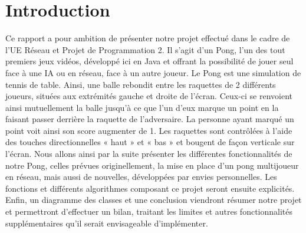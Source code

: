 \chapter{Introduction}

Ce rapport a pour ambition de présenter notre projet effectué dans le cadre de l'UE Réseau et Projet
de Programmation 2. Il s'agit d'un Pong, l'un des tout premiers jeux vidéos, développé ici en Java
et offrant la possibilité de jouer seul face à une IA ou en réseau, face à un autre joueur. Le Pong est
une simulation de tennis de table. Ainsi, une balle rebondit entre les raquettes de 2 différents
joueurs, situées aux extrémités gauche et droite de l'écran. Ceux-ci se renvoient ainsi mutuellement
la balle jusqu'à ce que l'un d'eux marque un point en la faisant passer derrière la raquette de
l'adversaire. La personne ayant marqué un point voit ainsi son score augmenter de 1. Les raquettes
sont contrôlées à l'aide des touches directionnelles « haut » et « bas » et bougent de façon verticale
sur l'écran.
Nous allons ainsi par la suite présenter les différentes fonctionnalités de notre Pong, celles prévues
originellement, la mise en place d'un pong multijoueur en réseau, mais aussi de nouvelles,
développées par envies personnelles. Les fonctions et différents algorithmes composant ce projet seront ensuite explicités.
Enfin, un diagramme des classes et une conclusion viendront résumer notre projet et
permettront d'effectuer un bilan, traitant les limites et autres fonctionnalités supplémentaires qu'il
serait envisageable d'implémenter.
